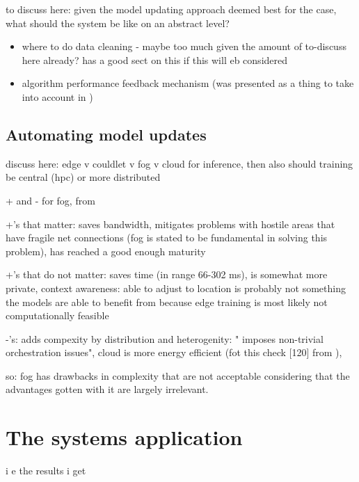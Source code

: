 
to discuss here: given the model updating approach deemed best for the case, what should the system be like on an abstract level?

\begin{itemize}
    \item where to do data cleaning - maybe too much given the amount of to-discuss here already? \cite{mlforstreamingsurvey} has a good sect on this if this will eb considered
    \item algorithm performance feedback mechanism (was presented as a thing to take into account in \cite{streamminingchallenges})
\end{itemize}

\section{Automating model updates}

discuss here: edge v couldlet v fog v cloud for inference, then also should training be central (hpc) or more distributed

+ and - for fog, from \cite{fogsurvey}

+'s that matter: saves bandwidth, mitigates problems with hostile areas that have fragile net connections (fog is stated to be fundamental in solving this problem), has reached a good enough maturity

+'s that do not matter: saves time (in range 66-302 ms), is somewhat more private, context awareness: able to adjust to location is probably not something the models are able to benefit from because edge training is most likely not computationally feasible

-'s: adds compexity by distribution and heterogenity: " imposes non-trivial orchestration issues", cloud is more energy efficient (fot this check [120] from \cite{fogsurvey}),

so: fog has drawbacks in complexity that are not acceptable considering that the advantages gotten with it are largely irrelevant.

\chapter{The systems application}

i e the results i get

